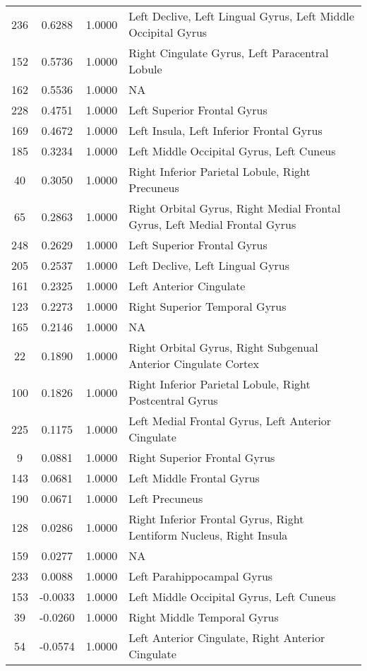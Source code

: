 \documentclass[10pt,letterpaper]{article}\usepackage[]{graphicx}\usepackage[]{color}
\begin{document}
\begin{center}
\begin{longtable}[c]{cccp{4in}}
		236	& 0.6288 & 1.0000 & Left Declive, Left Lingual Gyrus, Left Middle Occipital Gyrus \\
		152	& 0.5736 & 1.0000 & Right Cingulate Gyrus, Left Paracentral Lobule \\
		162	& 0.5536 & 1.0000 & NA \\
		228	& 0.4751 & 1.0000 & Left Superior Frontal Gyrus \\
		169	& 0.4672 & 1.0000 & Left Insula, Left Inferior Frontal Gyrus \\
		185	& 0.3234 & 1.0000 & Left Middle Occipital Gyrus, Left Cuneus \\
		40	& 0.3050 & 1.0000 & Right Inferior Parietal Lobule, Right Precuneus \\
		65	& 0.2863 & 1.0000 & Right Orbital Gyrus, Right Medial Frontal Gyrus, Left Medial Frontal Gyrus \\
		248	& 0.2629 & 1.0000 & Left Superior Frontal Gyrus \\
		205	& 0.2537 & 1.0000 & Left Declive, Left Lingual Gyrus \\
		161	& 0.2325 & 1.0000 & Left Anterior Cingulate \\
		123	& 0.2273 & 1.0000 & Right Superior Temporal Gyrus \\
		165	& 0.2146 & 1.0000 & NA \\
		22	& 0.1890 & 1.0000 & Right Orbital Gyrus, Right Subgenual Anterior Cingulate Cortex \\
		100	& 0.1826 & 1.0000 & Right Inferior Parietal Lobule, Right Postcentral Gyrus \\
		225	& 0.1175 & 1.0000 & Left Medial Frontal Gyrus, Left Anterior Cingulate \\
		9	& 0.0881 & 1.0000 & Right Superior Frontal Gyrus \\
		143	& 0.0681 & 1.0000 & Left Middle Frontal Gyrus \\
		190	& 0.0671 & 1.0000 & Left Precuneus \\
		128	& 0.0286 & 1.0000 & Right Inferior Frontal Gyrus, Right Lentiform Nucleus, Right Insula \\
		159	& 0.0277 & 1.0000 & NA \\
		233	& 0.0088 & 1.0000 & Left Parahippocampal Gyrus \\
		153	& -0.0033 & 1.0000 & Left Middle Occipital Gyrus, Left Cuneus \\
		39	& -0.0260 & 1.0000 & Right Middle Temporal Gyrus \\
		54	& -0.0574 & 1.0000 & Left Anterior Cingulate, Right Anterior Cingulate \\

\end{longtable}
\end{center}
\end{document}
